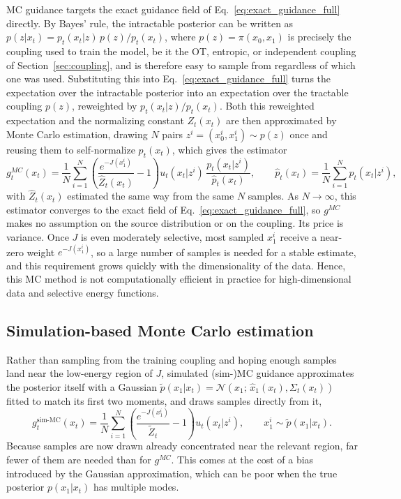 \documentclass{article}
\begin{document}
MC guidance targets the exact guidance field of Eq.~\eqref{eq:exact_guidance_full} directly.
By Bayes' rule, the intractable posterior can be written as $p(z|x_t) = p_t(x_t|z)\, p(z) / p_t(x_t)$, where $p(z) = \pi(x_0,x_1)$ is precisely the coupling used to train the model, be it the OT, entropic, or independent coupling of Section~\ref{sec:coupling}, and is therefore easy to sample from regardless of which one was used.
Substituting this into Eq.~\eqref{eq:exact_guidance_full} turns the expectation over the intractable posterior into an expectation over the tractable coupling $p(z)$, reweighted by $p_t(x_t|z)/p_t(x_t)$.
Both this reweighted expectation and the normalizing constant $Z_t(x_t)$ are then approximated by Monte Carlo estimation, drawing $N$ pairs $z^i=(x_0^i,x_1^i) \sim p(z)$ once and reusing them to self-normalize $p_t(x_t)$, which gives the estimator
\begin{equation}
    g_t^{MC}(x_t) = \frac{1}{N}\sum_{i=1}^N \left(\frac{e^{-J(x_1^i)}}{\hat{Z}_t(x_t)} - 1\right) u_t(x_t|z^i)\, \frac{p_t(x_t|z^i)}{\hat{p}_t(x_t)}, \qquad \hat{p}_t(x_t) = \frac{1}{N}\sum_{i=1}^N p_t(x_t|z^i),
    \label{eq:mc_guidance}
\end{equation}
with $\hat{Z}_t(x_t)$ estimated the same way from the same $N$ samples.
As $N \to \infty$, this estimator converges to the exact field of Eq.~\eqref{eq:exact_guidance_full}, so $g^{MC}$ makes no assumption on the source distribution or on the coupling.
Its price is variance.
Once $J$ is even moderately selective, most sampled $x_1^i$ receive a near-zero weight $e^{-J(x_1^i)}$, so a large number of samples is needed for a stable estimate, and this requirement grows quickly with the dimensionality of the data.
Hence, this MC method is not computationally efficient in practice for high-dimensional data and selective energy functions.

\subsection{Simulation-based Monte Carlo estimation}

Rather than sampling from the training coupling and hoping enough samples land near the low-energy region of $J$, simulated (sim-)MC guidance approximates the posterior itself with a Gaussian $\tilde{p}(x_1|x_t) = \mathcal{N}(x_1;\, \hat{x}_1(x_t), \Sigma_t(x_t))$ fitted to match its first two moments, and draws samples directly from it,
\begin{equation}
    g_t^{\text{sim-MC}}(x_t) = \frac{1}{N} \sum_{i=1}^N \left(\frac{e^{-J(x_1^i)}}{\tilde{Z}_t} - 1\right) u_t(x_t|z^i), \qquad x_1^i \sim \tilde{p}(x_1|x_t).
    \label{eq:sim_mc_guidance}
\end{equation}
Because samples are now drawn already concentrated near the relevant region, far fewer of them are needed than for $g^{MC}$.
This comes at the cost of a bias introduced by the Gaussian approximation, which can be poor when the true posterior $p(x_1|x_t)$ has multiple modes.
\end{document}
